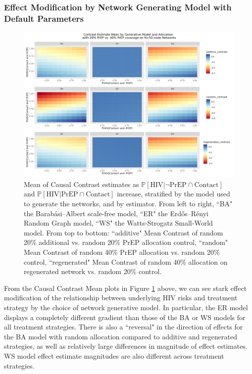 \documentclass{article}
\theoremstyle{definition}
\begin{document}
\subsubsection{Effect Modification by Network Generating Model with Default Parameters}
\begin{figure}[H]
    \centering
    \includegraphics[width=\linewidth]{Corrected Figures/Generative Model Mean Plot.png}
    \caption{Mean of Causal Contrast estimates as $\mathbb{P}\left[\text{HIV} \vert \neg \text{PrEP} \cap \text{Contact}\right]$ and $\mathbb{P}\left[\text{HIV} \vert \text{PrEP} \cap \text{Contact}\right]$ increase, stratified by the model used to generate the networks, and by estimator. From left to right, ``BA" the Barabási–Albert scale-free model, ``ER" the Erdős–Rényi Random Graph model, ``WS" the Watts-Strogatz Small-World model. From top to bottom: ``additive" Mean Contrast of random 20\% additional vs. random 20\% PrEP allocation control, ``random" Mean Contrast of random 40\% PrEP allocation vs. random 20\% control, ``regenerated" Mean Contrast of random 40\% allocation on regenerated network vs. random 20\% control. }
    \label{fig:Figure S4.17}
\end{figure}
From the Causal Contrast Mean plots in Figure \ref{fig:Figure S4.17} above, we can see stark effect modification of the relationship between underlying HIV risks and treatment strategy by the choice of network generative model. In particular, the ER model displays a completely different gradient than those of the BA or WS models for all treatment strategies. There is also a ``reversal" in the direction of effects for the BA model with random allocation compared to additive and regenerated strategies, as well as relatively large differences in magnitude of effect estimates. WS model effect estimate magnitudes are also different across treatment strategies. 
\end{document}
